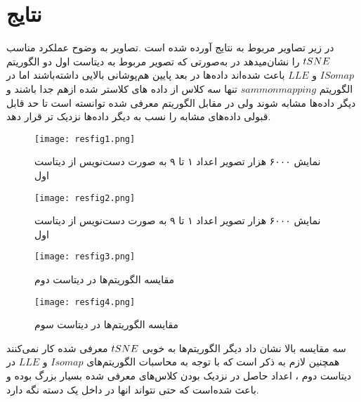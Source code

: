 \section*{نتایج}
در زیر تصاویر مربوط به نتایج آورده شده است .تصاویر به وضوح عملکرد مناسب$t\-SNE$ را نشان‌میدهد در به‌صورتی که تصویر مربوط به دیتاست اول دو الگوریتم $ISomap$ و $LLE$ باعث شده‌اند داده‌ها در بعد پایین هم‌پوشانی بالایی داشته‌باشند اما در الگوریتم $sammon mapping$ تنها سه کلاس از داده های کلاستر شده از‌هم جدا باشند و دیگر داده‌ها مشابه شوند ولی در مقابل الگوریتم معرفی شده توانسته است تا حد قابل قبولی داده‌های مشابه را نسب به دیگر داده‌ها نزدیک تر قرار دهد.

\begin{figure}
	\centering\texttt{[image: resfig1.png]}
	\caption{نمایش ۶۰۰۰ هزار تصویر اعداد ۱ تا ۹ به صورت دست‌نویس از دیتاست اول}\label{resfig.1}
\end{figure}

\begin{figure}
	\centering\texttt{[image: resfig2.png]}
	\caption{نمایش ۶۰۰۰ هزار تصویر اعداد ۱ تا ۹ به صورت دست‌نویس از دیتاست اول}\label{resfig.2}
\end{figure}

\begin{figure}
	\centering\texttt{[image: resfig3.png]}
	\caption{مقایسه الگوریتم‌ها در دیتاست دوم}\label{resfig.3}
\end{figure}

\begin{figure}
	\centering\texttt{[image: resfig4.png]}
	\caption{مقایسه الگوریتم‌ها در دیتاست سوم}\label{resfig.4}
\end{figure}
سه مقایسه بالا نشان داد دیگر الگوریتم‌ها به خوبی $t\-SNE$ معرفی شده کار نمی‌کنند همچنین لازم به ذکر است که با توجه به محاسبات الگوریتم‌های $Isomap$ و  $LLE$  در دیتاست دوم ، اعداد حاصل در نزدیک بودن کلاس‌های معرفی شده بسیار بزرگ بوده و باعث شده‌است که حتی نتواند انها در  داخل یک دسته نگه دارد.

